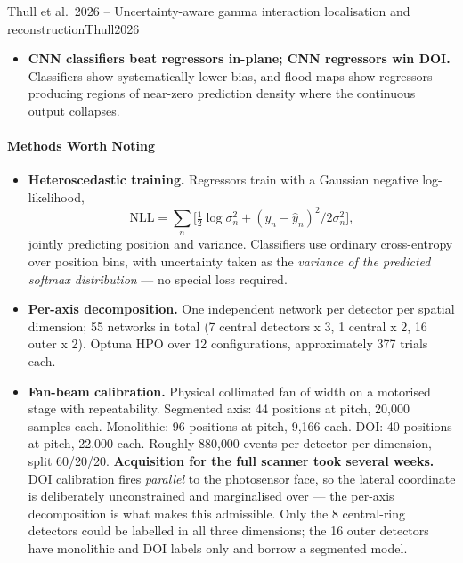 \begin{papernote}{Thull et al.\ 2026 -- Uncertainty-aware gamma interaction localisation and reconstruction}{Thull2026}
\begin{itemize}
        rods rises from 1.0985 to 1.1840 under filtering and to 1.2171 under LOR weighting
        at $p = 4$, but COV at $p = 4$ blows out to 10.19\%. Filtering dominated weighting
        at matched effort; recovery coefficients improved at every rod diameter under both.
    \item \textbf{CNN classifiers beat regressors in-plane; CNN regressors win DOI.}
        Classifiers show systematically lower bias, and flood maps show regressors
        producing regions of near-zero prediction density where the continuous output
        collapses.
\end{itemize}

\paragraph{Methods Worth Noting}
\begin{itemize}
    \item \textbf{Heteroscedastic training.} Regressors train with a Gaussian
        negative log-likelihood,
        \[\mathrm{NLL} = \sum_n \bigl[\tfrac{1}{2}\log \sigma_n^2
            + (y_n - \hat{y}_n)^2 / 2\sigma_n^2\bigr],\]
        jointly predicting position and variance. Classifiers use ordinary
        cross-entropy over position bins, with uncertainty taken as the \emph{variance of
        the predicted softmax distribution} --- no special loss required.
    \item \textbf{Per-axis decomposition.} One independent network per detector per spatial
        dimension; 55 networks in total (7 central detectors x 3, 1 central x 2, 16 outer
        x 2). Optuna HPO over 12 configurations, approximately 377 trials each.
    \item \textbf{Fan-beam calibration.} Physical collimated fan of  width on a
        motorised stage with  repeatability. Segmented axis: 44 positions at 
        pitch, 20{,}000 samples each. Monolithic: 96 positions at  pitch, 9{,}166
        each. DOI: 40 positions at  pitch, 22{,}000 each. Roughly 880{,}000 events
        per detector per dimension, split 60/20/20. \textbf{Acquisition for the full
        scanner took several weeks.} DOI calibration fires \emph{parallel} to the
        photosensor face, so the lateral coordinate is deliberately unconstrained and
        marginalised over --- the per-axis decomposition is what makes this admissible.
        Only the 8 central-ring detectors could be labelled in all three dimensions; the 16
        outer detectors have monolithic and DOI labels only and borrow a segmented model.

\end{itemize}
\end{papernote}
